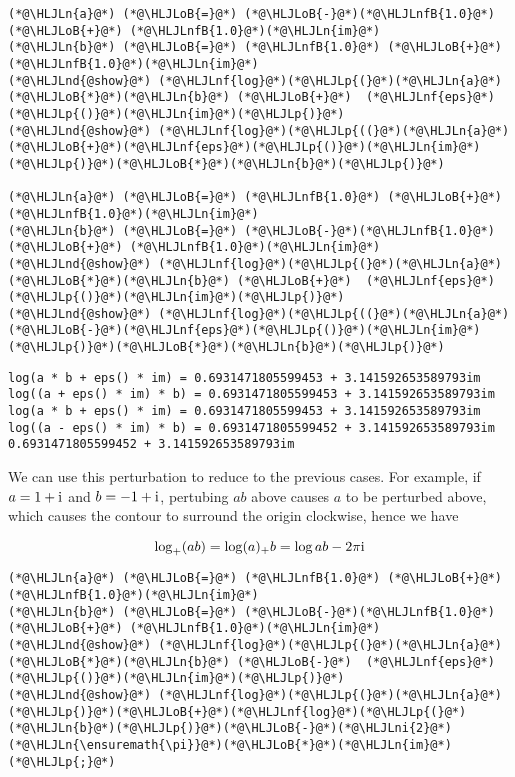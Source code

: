 \documentclass[12pt,a4paper]{article}
\newcommand{\HLJLn}[1]{#1}
\newcommand{\HLJLnd}[1]{\textcolor[RGB]{214,102,97}{#1}}
\newcommand{\HLJLnf}[1]{\textcolor[RGB]{66,102,213}{#1}}
\newcommand{\HLJLnfB}[1]{\textcolor[RGB]{59,151,46}{#1}}
\newcommand{\HLJLni}[1]{\textcolor[RGB]{59,151,46}{#1}}
\newcommand{\HLJLoB}[1]{\textcolor[RGB]{102,102,102}{\textbf{#1}}}
\newcommand{\HLJLp}[1]{#1}
\def\I{ {\rm i} }
\begin{document}
\begin{lstlisting}
(*@\HLJLn{a}@*) (*@\HLJLoB{=}@*) (*@\HLJLoB{-}@*)(*@\HLJLnfB{1.0}@*) (*@\HLJLoB{+}@*) (*@\HLJLnfB{1.0}@*)(*@\HLJLn{im}@*)
(*@\HLJLn{b}@*) (*@\HLJLoB{=}@*) (*@\HLJLnfB{1.0}@*) (*@\HLJLoB{+}@*) (*@\HLJLnfB{1.0}@*)(*@\HLJLn{im}@*)
(*@\HLJLnd{@show}@*) (*@\HLJLnf{log}@*)(*@\HLJLp{(}@*)(*@\HLJLn{a}@*)(*@\HLJLoB{*}@*)(*@\HLJLn{b}@*) (*@\HLJLoB{+}@*)  (*@\HLJLnf{eps}@*)(*@\HLJLp{()}@*)(*@\HLJLn{im}@*)(*@\HLJLp{)}@*)
(*@\HLJLnd{@show}@*) (*@\HLJLnf{log}@*)(*@\HLJLp{((}@*)(*@\HLJLn{a}@*)(*@\HLJLoB{+}@*)(*@\HLJLnf{eps}@*)(*@\HLJLp{()}@*)(*@\HLJLn{im}@*)(*@\HLJLp{)}@*)(*@\HLJLoB{*}@*)(*@\HLJLn{b}@*)(*@\HLJLp{)}@*)

(*@\HLJLn{a}@*) (*@\HLJLoB{=}@*) (*@\HLJLnfB{1.0}@*) (*@\HLJLoB{+}@*) (*@\HLJLnfB{1.0}@*)(*@\HLJLn{im}@*)
(*@\HLJLn{b}@*) (*@\HLJLoB{=}@*) (*@\HLJLoB{-}@*)(*@\HLJLnfB{1.0}@*) (*@\HLJLoB{+}@*) (*@\HLJLnfB{1.0}@*)(*@\HLJLn{im}@*)
(*@\HLJLnd{@show}@*) (*@\HLJLnf{log}@*)(*@\HLJLp{(}@*)(*@\HLJLn{a}@*)(*@\HLJLoB{*}@*)(*@\HLJLn{b}@*) (*@\HLJLoB{+}@*)  (*@\HLJLnf{eps}@*)(*@\HLJLp{()}@*)(*@\HLJLn{im}@*)(*@\HLJLp{)}@*)
(*@\HLJLnd{@show}@*) (*@\HLJLnf{log}@*)(*@\HLJLp{((}@*)(*@\HLJLn{a}@*)(*@\HLJLoB{-}@*)(*@\HLJLnf{eps}@*)(*@\HLJLp{()}@*)(*@\HLJLn{im}@*)(*@\HLJLp{)}@*)(*@\HLJLoB{*}@*)(*@\HLJLn{b}@*)(*@\HLJLp{)}@*)
\end{lstlisting}

\begin{lstlisting}
log(a * b + eps() * im) = 0.6931471805599453 + 3.141592653589793im
log((a + eps() * im) * b) = 0.6931471805599453 + 3.141592653589793im
log(a * b + eps() * im) = 0.6931471805599453 + 3.141592653589793im
log((a - eps() * im) * b) = 0.6931471805599452 + 3.141592653589793im
0.6931471805599452 + 3.141592653589793im
\end{lstlisting}


We can use this perturbation to reduce to the previous cases. For example, if $a = 1 + \I$ and $b = -1 + \I$, pertubing $ab$ above causes $a$ to be perturbed  above, which causes the contour to surround the origin clockwise, hence we have

\[
\log_+(ab) = \log(a)_+b = \log a b - 2 \pi \I
\]

\begin{lstlisting}
(*@\HLJLn{a}@*) (*@\HLJLoB{=}@*) (*@\HLJLnfB{1.0}@*) (*@\HLJLoB{+}@*) (*@\HLJLnfB{1.0}@*)(*@\HLJLn{im}@*)
(*@\HLJLn{b}@*) (*@\HLJLoB{=}@*) (*@\HLJLoB{-}@*)(*@\HLJLnfB{1.0}@*) (*@\HLJLoB{+}@*) (*@\HLJLnfB{1.0}@*)(*@\HLJLn{im}@*)
(*@\HLJLnd{@show}@*) (*@\HLJLnf{log}@*)(*@\HLJLp{(}@*)(*@\HLJLn{a}@*)(*@\HLJLoB{*}@*)(*@\HLJLn{b}@*) (*@\HLJLoB{-}@*)  (*@\HLJLnf{eps}@*)(*@\HLJLp{()}@*)(*@\HLJLn{im}@*)(*@\HLJLp{)}@*)
(*@\HLJLnd{@show}@*) (*@\HLJLnf{log}@*)(*@\HLJLp{(}@*)(*@\HLJLn{a}@*)(*@\HLJLp{)}@*)(*@\HLJLoB{+}@*)(*@\HLJLnf{log}@*)(*@\HLJLp{(}@*)(*@\HLJLn{b}@*)(*@\HLJLp{)}@*)(*@\HLJLoB{-}@*)(*@\HLJLni{2}@*)(*@\HLJLn{\ensuremath{\pi}}@*)(*@\HLJLoB{*}@*)(*@\HLJLn{im}@*)(*@\HLJLp{;}@*)
\end{lstlisting}
\end{document}
